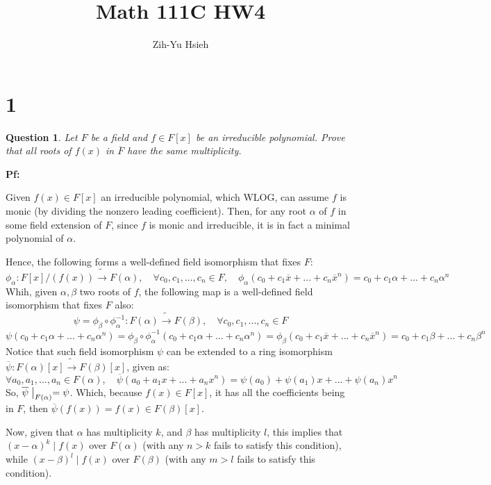 \documentclass{article}
\title{Math 111C HW4}
\author{Zih-Yu Hsieh}
\newtheorem{question}{Question}
\begin{document}
\maketitle

\section*{1}
\begin{myBox}[]{}
    \begin{question}
        Let $F$ be a field and $f\in F[x]$ be an irreducible polynomial. Prove that all roots of $f(x)$ in $\overline{F}$ have the same multiplicity.
    \end{question}
\end{myBox}

\textbf{Pf:}

Given $f(x)\in F[x]$ an irreducible polynomial, which WLOG, can assume $f$ is monic (by dividing the nonzero leading coefficient). Then, for any root $\alpha$ of $f$ in some field extension of $F$, since $f$ is monic and irreducible, it is in fact a minimal polynomial of $\alpha$.

Hence, the following forms a well-defined field isomorphism that fixes $F$:
$$\phi_\alpha:F[x]/(f(x))\tilde{\rightarrow} F(\alpha),\quad \forall c_0,c_1,...,c_n\in F,\quad \phi_\alpha(c_0+c_1\overline{x}+...+c_n\overline{x}^n) = c_0+c_1\alpha+...+c_n\alpha^n$$
Whih, given $\alpha,\beta$ two roots of $f$, the following map is a well-defined field isomorphism that fixes $F$ also:
$$\psi = \phi_\beta\circ \phi_\alpha^{-1}:F(\alpha)\tilde{\rightarrow} F(\beta),\quad \forall c_0,c_1,...,c_n\in F$$
$$\psi(c_0+c_1\alpha+...+c_n\alpha^n) = \phi_\beta\circ \phi_\alpha^{-1}(c_0+c_1\alpha+...+c_n\alpha^n) = \phi_\beta(c_0+c_1\overline{x}+...+c_n\overline{x}^n) = c_0+c_1\beta+...+c_n\beta^n$$
Notice that such field isomorphism $\psi$ can be extended to a ring isomorphism $\overline{\psi}:F(\alpha)[x]\tilde{\rightarrow} F(\beta)[x]$, given as:
$$\forall a_0,a_1,...,a_n\in F(\alpha),\quad \overline{\psi}(a_0+a_1x+...+a_nx^n)=\psi(a_0)+\psi(a_1)x+...+\psi(a_n)x^n$$
So, $\overline{\psi}\bigm|_{F(\alpha)} = \psi$. Which, because $f(x)\in F[x]$, it has all the coefficients being in $F$, then $\overline{\psi}(f(x))=f(x)\in F(\beta)[x]$.

\hfil

Now, given that $\alpha$ has multiplicity $k$, and $\beta$ has multiplicity $l$, this implies that $(x-\alpha)^k\mid f(x)$ over $F(\alpha)$ (with any $n>k$ fails to satisfy this condition), while $(x-\beta)^l\mid f(x)$ over $F(\beta)$ (with any $m>l$ fails to satisfy this condition).
\end{document}
